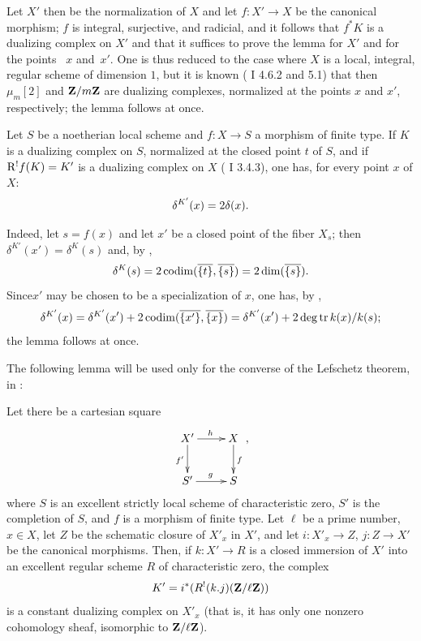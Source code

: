Let $X'$ then be the normalization of $X$ and let $f:X'\to X$ be the canonical morphism; $f$ is integral, surjective, and radicial, and it follows that $f^*K$ is a dualizing complex on $X'$ and that it suffices to prove the lemma for $X'$ and for the points ~$x$ and~$x'$. One is thus reduced to the case where $X$ is a local, integral, regular scheme of dimension $1$, but it is known (\cf {} I 4.6.2 and 5.1) that then $\mu_m[2]$ and $\ZZ/m\ZZ$ are dualizing complexes, normalized at the points $x$ and $x'$, respectively; the lemma follows at once.

\begin{sublemme} \label{XIV.2.3.2} Let $S$ be a noetherian local scheme and $f:X\to S$ a morphism of finite type. If $K$ is a dualizing complex on $S$, normalized at the closed point $t$ of $S$, and if $\R^!f(K)=K'$ is a dualizing complex on $X$ (\cf {} I 3.4.3), one has, for every point $x$ of $X$:$$
\delta^{\sisi{K}{{K'}}}(x)=2\delta(x).
$$
\end{sublemme}

Indeed, let $s=f(x)$ and let $x'$ be a closed point of the fiber $X_s$; then $\delta^{K'}(x')=\delta^K(s)$ and, by ,
$$
\delta^K(s)=2\codim(\overline{\{t\}}, \overline{\{s\}})=2\dim(\overline{\{s\}}).
$$
Since\pageoriginaled $x'$ may be chosen to be a specialization of $x$, one has, by ,
$$
\delta^{K'}(x)=\delta^{K'}(x')+2\codim(\overline{\{x'\}}, \overline{\{x\}})=\delta^{K'}(x')+2\degtr k(x)/k(s);$$
the lemma follows at once.

The following lemma will be used only for the converse of the Lefschetz theorem, in \numero{}:

\begin{sublemme} \label{XIV.2.3.3}
Let there be a cartesian square
$$
\xymatrix{X'\ar[r]^{h}\ar[d]_{f'}&X\ar[d]^f\\S'\ar[r]^g&S},
$$
where $S$ is an excellent strictly local scheme of characteristic zero, $S'$ is the completion of $S$, and $f$ is a morphism of finite type. Let $\ell$ be a prime number, $x\in X$, let $Z$ be the schematic closure of $X'_x$ in $X'$, and let $i:X'_x\to Z$, $j:Z\to X'$ be the canonical morphisms. Then, if $k:X'\to R$ is a closed immersion of $X'$ into an excellent regular scheme $R$ of characteristic zero, the complex
$$K'=i^*(R^!(k.j)(\ZZ/\ell\ZZ))$$
is a constant dualizing complex on $X'_x$ (that is, it has only one nonzero cohomology sheaf, isomorphic to $\ZZ/\ell\ZZ$).
\end{sublemme}

